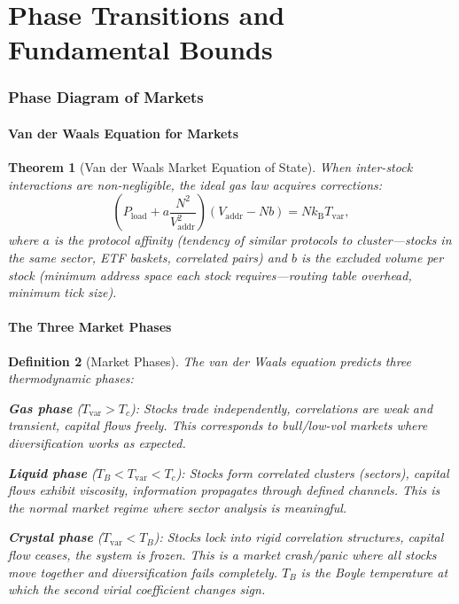 \documentclass[twocolumn,10pt]{article}
\newtheorem{theorem}{Theorem}[section]
\newtheorem{definition}[theorem]{Definition}
\theoremstyle{remark}
\newcommand{\kB}{k_{\mathrm{B}}}
\newcommand{\Tvar}{T_{\mathrm{var}}}
\newcommand{\Pload}{P_{\mathrm{load}}}
\newcommand{\Vaddr}{V_{\mathrm{addr}}}
\begin{document}
\part{Phase Transitions and Fundamental Bounds}

\section{Phase Diagram of Markets}
\label{sec:phase_diagram}

\subsection{Van der Waals Equation for Markets}

\begin{theorem}[Van der Waals Market Equation of State]
\label{thm:vdw}
When inter-stock interactions are non-negligible, the ideal gas law acquires corrections:
\begin{equation}
    \boxed{\left(\Pload + a\frac{N^2}{\Vaddr^2}\right)(\Vaddr - Nb) = N\kB\Tvar},
    \label{eq:vdw}
\end{equation}
where $a$ is the \emph{protocol affinity} (tendency of similar protocols to cluster---stocks in the same sector, ETF baskets, correlated pairs) and $b$ is the \emph{excluded volume} per stock (minimum address space each stock requires---routing table overhead, minimum tick size).
\end{theorem}

\subsection{The Three Market Phases}

\begin{definition}[Market Phases]
\label{def:phases}
The van der Waals equation predicts three thermodynamic phases:

\textbf{Gas phase} ($\Tvar > T_c$): Stocks trade independently, correlations are weak and transient, capital flows freely.  This corresponds to \emph{bull/low-vol markets} where diversification works as expected.

\textbf{Liquid phase} ($T_B < \Tvar < T_c$): Stocks form correlated clusters (sectors), capital flows exhibit viscosity, information propagates through defined channels.  This is the \emph{normal market regime} where sector analysis is meaningful.

\textbf{Crystal phase} ($\Tvar < T_B$): Stocks lock into rigid correlation structures, capital flow ceases, the system is frozen.  This is a \emph{market crash/panic} where all stocks move together and diversification fails completely.  $T_B$ is the Boyle temperature at which the second virial coefficient changes sign.
\end{definition}
\end{document}
